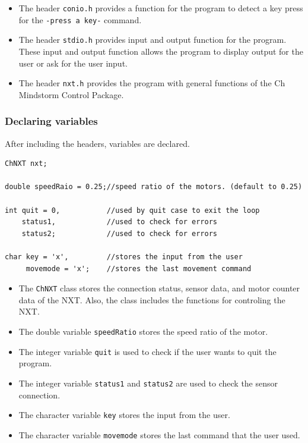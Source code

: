 \documentclass[11pt]{article}
\begin{document}
\begin{itemize}
\item The header {\tt conio.h} provides a function for the program to detect a 
    key press for the {\tt -press a key-} command.
\item The header {\tt stdio.h} provides input and output function for the program. 
    These input and output function allows the program to display output for the 
    user or ask for the user input.
\item The header {\tt nxt.h} provides the program with general functions of the 
    Ch Mindstorm Control Package.
\end{itemize}

\subsubsection*{Declaring variables}
After including the headers, variables are declared.
\begin{lstlisting}
ChNXT nxt;

double speedRaio = 0.25;//speed ratio of the motors. (default to 0.25)

int quit = 0,           //used by quit case to exit the loop
    status1,            //used to check for errors
    status2;            //used to check for errors

char key = 'x',	        //stores the input from the user
     movemode = 'x';    //stores the last movement command
 \end{lstlisting}

\begin{itemize}
\item The {\tt ChNXT} class stores the connection status, sensor data, and motor 
    counter data of the NXT. Also, the class includes the functions for controling 
    the NXT.
\item The double variable {\tt speedRatio} stores the speed ratio of the motor.
\item The integer variable {\tt quit} is used to check if the user wants to quit 
    the program.
\item The integer variable {\tt status1} and {\tt status2} are used to check the 
    sensor connection.
\item The character variable {\tt key} stores the input from the user.
\item The character variable {\tt movemode} stores the last command that the user 
    used.
\end{itemize}
\end{document}
